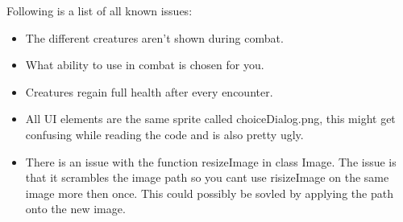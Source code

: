 Following is a list of all known issues:
\begin{itemize}[$\circ$]
	\item The different creatures aren't shown during combat.
	\item What ability to use in combat is chosen for you.
	\item Creatures regain full health after every encounter.
	\item All UI elements are the same sprite called choiceDialog.png, this might get confusing while reading the code and is also pretty ugly.
	\item There is an issue with the function resizeImage in class Image. The issue is that it scrambles the image path so you cant use risizeImage on the same image more then once. This could possibly be sovled by applying the path onto the new image.
\end{itemize}
